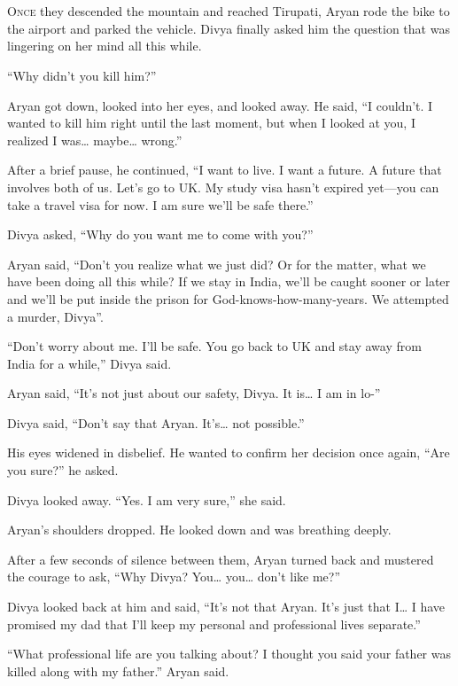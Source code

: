 \chapter{}

\lettrine{O}{nce} they descended the mountain and reached Tirupati, Aryan rode the bike to
the airport and parked the vehicle. Divya finally asked him the question that
was lingering on her mind all this while.

“Why didn't you kill him?”

Aryan got down, looked into her eyes, and looked away. He said, “I couldn't. I
wanted to kill him right until the last moment, but when I looked at you, I
realized I was… maybe… wrong.”

After a brief pause, he continued, “I want to live. I want a future. A future
that involves both of us. Let's go to UK. My study visa hasn't expired yet—you
can take a travel visa for now. I am sure we'll be safe there.”

Divya asked, “Why do you want me to come with you?”

Aryan said, “Don't you realize what we just did? Or for the matter, what we have
been doing all this while? If we stay in India, we'll be caught sooner or later
and we'll be put inside the prison for God-knows-how-many-years. We attempted a
murder, Divya”.

“Don't worry about me. I'll be safe. You go back to UK and stay away from India
for a while,” Divya said.

Aryan said, “It's not just about our safety, Divya. It is… I am in lo-”

Divya said, “Don't say that Aryan. It's… not possible.”

His eyes widened in disbelief. He wanted to confirm her decision once again,
“Are you sure?” he asked.

Divya looked away. “Yes. I am very sure,” she said.

Aryan's shoulders dropped. He looked down and was breathing deeply.

After a few seconds of silence between them, Aryan turned back and mustered the
courage to ask, “Why Divya? You… you… don't like me?”

Divya looked back at him and said, “It's not that Aryan. It's just that I…
I have promised my dad that I'll keep my personal and professional lives
separate.”

“What professional life are you talking about? I thought you said your father
was killed along with my father.” Aryan said.

